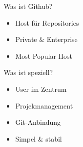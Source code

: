 \begin{frame}
\begin{columns}
\begin{column}{5cm}
\begin{figure}
			\end{figure}
		\end{column}
		\begin{column}{5cm}
			\begin{block}{Was ist Github?}
		                \begin{itemize}
					\item Host für Repositories
					\item Private \& Enterprise
					\item Most Popular Host
				\end{itemize}
			\end{block}
			\begin{block}{Was ist speziell?}
				\begin{itemize}
					\item User im Zentrum
					\item Projekmanagement
					\item Git-Anbindung
					\item Simpel \& stabil
				\end{itemize}
			\end{block}
		\end{column}
	\end{columns}
\end{frame}

